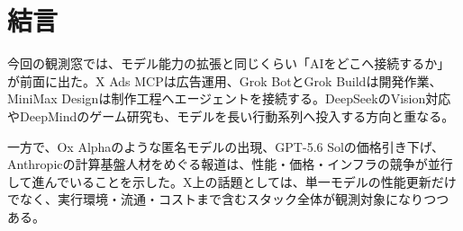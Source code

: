 \section{結言}
今回の観測窓では、モデル能力の拡張と同じくらい「AIをどこへ接続するか」が前面に出た。X Ads MCPは広告運用、Grok BotとGrok Buildは開発作業、MiniMax Designは制作工程へエージェントを接続する。DeepSeekのVision対応やDeepMindのゲーム研究も、モデルを長い行動系列へ投入する方向と重なる。

一方で、Ox Alphaのような匿名モデルの出現、GPT-5.6 Solの価格引き下げ、Anthropicの計算基盤人材をめぐる報道は、性能・価格・インフラの競争が並行して進んでいることを示した。X上の話題としては、単一モデルの性能更新だけでなく、実行環境・流通・コストまで含むスタック全体が観測対象になりつつある。
